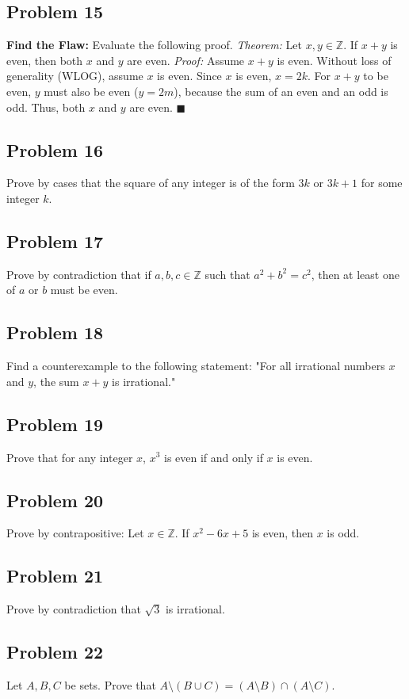 \documentclass[11pt]{article}
\begin{document}
\subsection{Problem 15}
\textbf{Find the Flaw:} Evaluate the following proof.
\textit{Theorem:} Let $x, y \in \mathbb{Z}$. If $x+y$ is even, then both $x$ and $y$ are even.
\textit{Proof:} Assume $x+y$ is even. Without loss of generality (WLOG), assume $x$ is even. Since $x$ is even, $x = 2k$. For $x+y$ to be even, $y$ must also be even ($y = 2m$), because the sum of an even and an odd is odd. Thus, both $x$ and $y$ are even. $\blacksquare$

\subsection{Problem 16}
Prove by cases that the square of any integer is of the form $3k$ or $3k+1$ for some integer $k$.

\subsection{Problem 17}
Prove by contradiction that if $a, b, c \in \mathbb{Z}$ such that $a^2 + b^2 = c^2$, then at least one of $a$ or $b$ must be even.

\subsection{Problem 18}
Find a counterexample to the following statement: "For all irrational numbers $x$ and $y$, the sum $x+y$ is irrational."

\subsection{Problem 19}
Prove that for any integer $x$, $x^3$ is even if and only if $x$ is even.

\subsection{Problem 20}
Prove by contrapositive: Let $x \in \mathbb{Z}$. If $x^2 - 6x + 5$ is even, then $x$ is odd.

\subsection{Problem 21}
Prove by contradiction that $\sqrt{3}$ is irrational.

\subsection{Problem 22}
Let $A, B, C$ be sets. Prove that $A \setminus (B \cup C) = (A \setminus B) \cap (A \setminus C)$.
\end{document}
